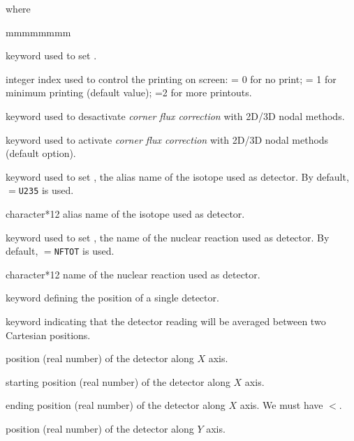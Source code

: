 \noindent where
\begin{ListeDeDescription}{mmmmmmmm}

\item[\moc{EDIT}] keyword used to set .

\item[\dusa{iprint}] integer index used to control the printing on screen:
 = 0 for no print; = 1 for minimum printing (default value); =2 for more printouts.

\item[\moc{NOCCOR}] keyword used to desactivate {\sl corner flux correction} with 2D/3D nodal methods.

\item[\moc{CCOR}] keyword used to activate {\sl corner flux correction} with 2D/3D nodal methods (default option).

\item[\moc{DETNAME}] keyword used to set , the alias name of the isotope used as detector. By default, $=${\tt U235} is used.

\item[\dusa{dname}] character*12 alias name of the isotope used as detector.

\item[\moc{REANAME}] keyword used to set , the name of the nuclear reaction used as detector. By default, $=${\tt NFTOT} is used.

\item[\dusa{rname}] character*12 name of the nuclear reaction used as detector.

\item[\moc{POSITION}] keyword defining the position of a single detector.

\item[\moc{INTEG}] keyword indicating that the detector reading will be averaged between two Cartesian positions.

\item[\dusa{valx}] position (real number) of the detector along $X$ axis.

\item[\dusa{valx1}] starting position (real number) of the detector along $X$ axis.

\item[\dusa{valx2}] ending position (real number) of the detector along $X$ axis. We must have $<$.
 
\item[\dusa{valy}] position (real number) of the detector along $Y$ axis.


\end{ListeDeDescription}
